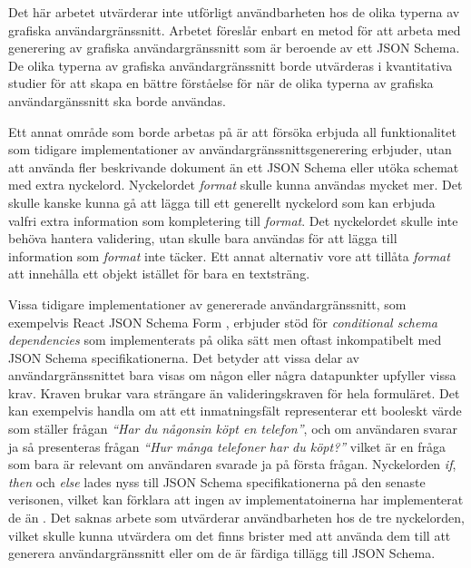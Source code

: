 Det här arbetet utvärderar inte utförligt användbarheten hos de olika typerna av grafiska användargränssnitt. Arbetet föreslår enbart en metod för att arbeta med generering av grafiska användargränssnitt som är beroende av ett JSON Schema. De olika typerna av grafiska användargränssnitt borde utvärderas i kvantitativa studier för att skapa en bättre förståelse för när de olika typerna av grafiska användargänssnitt ska borde användas.

Ett annat område som borde arbetas på är att försöka erbjuda all funktionalitet som tidigare implementationer av användargränssnittsgenerering erbjuder, utan att använda fler beskrivande dokument än ett JSON Schema eller utöka schemat med extra nyckelord. Nyckelordet \textit{format} skulle kunna användas mycket mer. Det skulle kanske kunna gå att lägga till ett generellt nyckelord som kan erbjuda valfri extra information som kompletering till \textit{format}. Det nyckelordet skulle inte behöva hantera validering, utan skulle bara användas för att lägga till information som \textit{format} inte täcker. Ett annat alternativ vore att tillåta \textit{format} att innehålla ett objekt istället för bara en textsträng.

Vissa tidigare implementationer av genererade användargränssnitt, som exempelvis React JSON Schema Form \cite{MozillaServices}, erbjuder stöd för \textit{conditional schema dependencies} som implementerats på olika sätt men oftast inkompatibelt med JSON Schema specifikationerna. Det betyder att vissa delar av användargränssnittet bara visas om någon eller några datapunkter upfyller vissa krav. Kraven brukar vara strängare än valideringskraven för hela formuläret. Det kan exempelvis handla om att ett inmatningsfält representerar ett booleskt värde som ställer frågan \textit{``Har du någonsin köpt en telefon''}, och om användaren svarar ja så presenteras frågan \textit{``Hur många telefoner har du köpt?''} vilket är en fråga som bara är relevant om användaren svarade ja på första frågan. Nyckelorden \textit{if}, \textit{then} och \textit{else} lades nyss till JSON Schema specifikationerna på den senaste verisonen, vilket kan förklara att ingen av implementatoinerna har implementerat de än \cite{Andrews2018}. Det saknas arbete som utvärderar användbarheten hos de tre nyckelorden, vilket skulle kunna utvärdera om det finns brister med att använda dem till att generera användargränssnitt eller om de är färdiga tillägg till JSON Schema.

